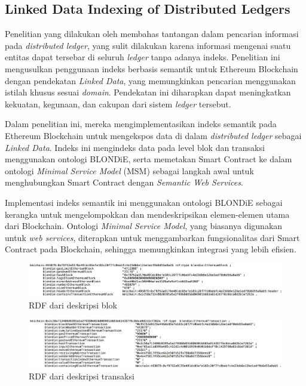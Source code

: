 \subsection{Linked Data Indexing of Distributed Ledgers}
\label{subsec:linked-data-indexing-distributed-ledgers}

Penelitian yang dilakukan oleh \cite{third2017linked} membahas tantangan dalam pencarian informasi pada \textit{distributed ledger}, yang sulit dilakukan karena informasi mengenai suatu entitas dapat tersebar di seluruh \textit{ledger} tanpa adanya indeks. Penelitian ini mengusulkan penggunaan indeks berbasis semantik untuk Ethereum Blockchain dengan pendekatan \textit{Linked Data}, yang memungkinkan pencarian menggunakan istilah khusus sesuai \textit{domain}. Pendekatan ini diharapkan dapat meningkatkan kekuatan, kegunaan, dan cakupan dari sistem \textit{ledger} tersebut.

Dalam penelitian ini, mereka mengimplementasikan indeks semantik pada Ethereum Blockchain untuk mengekspos data di dalam \textit{distributed ledger} sebagai \textit{Linked Data}. Indeks ini mengindeks data pada level blok dan transaksi menggunakan ontologi BLONDiE, serta memetakan Smart Contract ke dalam ontologi \textit{Minimal Service Model} (MSM) sebagai langkah awal untuk menghubungkan Smart Contract dengan \textit{Semantic Web Services}.

Implementasi indeks semantik ini menggunakan ontologi BLONDiE sebagai kerangka untuk mengelompokkan dan mendeskripsikan elemen-elemen utama dari Blockchain. Ontologi \textit{Minimal Service Model}, yang biasanya digunakan untuk \textit{web services}, diterapkan untuk menggambarkan fungsionalitas dari Smart Contract pada Blockchain, sehingga memungkinkan integrasi yang lebih efisien.

\begin{figure}
  \centering
  \includegraphics[width=1\textwidth]{resources/chapter-2/rdf-block.jpg}
  \caption{RDF dari deskripsi blok \parencite{third2017linked}}
  \label{image:rdf-block}
\end{figure}

\begin{figure}
  \centering
  \includegraphics[width=1\textwidth]{resources/chapter-2/rdf-transaction.jpg}
  \caption{RDF dari deskripsi transaksi \parencite{third2017linked}}
  \label{image:rdf-transaction}
\end{figure}


